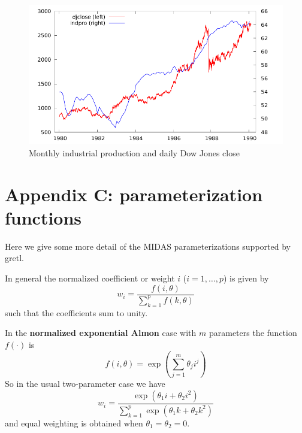 \documentclass{article}
\begin{document}
\begin{figure}[htbp]
  \centering
  \includegraphics{figures/midas_daily_plot}
  \caption{Monthly industrial production and daily Dow Jones close}
  \label{fig:daily}
\end{figure}

\clearpage

\section*{Appendix C: parameterization functions}
\label{app:c}

Here we give some more detail of the MIDAS parameterizations supported
by gretl.

\vspace{1ex}

In general the normalized coefficient or weight $i$ ($i=1,\ldots,p$)
is given by
\begin{equation}
\label{eq:general}
  w_i = \frac{f(i,\theta)}
  {\sum_{k=1}^pf(k,\theta)}
\end{equation}
such that the coefficients sum to unity.

In the \textbf{normalized exponential Almon} case with $m$ parameters
the function $f(\cdot)$ is
\begin{equation}
f(i,\theta) = \exp\left(\sum_{j=1}^m \theta_j i^j\right)
\end{equation}
So in the usual two-parameter case we have
\[
w_i =
  \frac{\exp\left(\theta_1 i + \theta_2 i^2\right)}
  {\sum_{k=1}^p \exp\left(\theta_1 k + \theta_2 k^2\right)}
\]
and equal weighting is obtained when $\theta_1 = \theta_2 = 0$.

\vspace{1ex}
\end{document}
